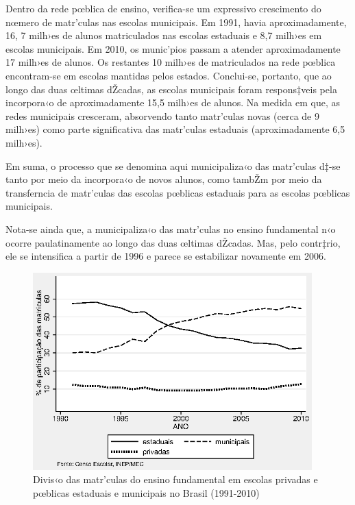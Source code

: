 \documentclass[a4paper, 12pt]{article}
\begin{document}
Dentro da rede pœblica de ensino, verifica-se um expressivo crescimento do nœmero de matr’culas nas escolas municipais. Em 1991, havia aproximadamente, 16, 7 milh›es de alunos matriculados nas escolas estaduais e 8,7 milh›es em escolas municipais. Em 2010, os munic’pios passam a atender aproximadamente 17 milh›es de alunos. Os restantes 10 milh›es de matriculados na rede pœblica encontram-se em escolas mantidas pelos estados. Conclui-se, portanto, que ao longo das duas œltimas dŽcadas, as escolas municipais foram respons‡veis pela incorpora‹o de aproximadamente 15,5  milh›es de alunos. Na medida em que, as redes municipais cresceram, absorvendo tanto matr’culas novas (cerca de 9 milh›es) como parte significativa das matr’culas estaduais (aproximadamente 6,5 milh›es). 

Em suma, o processo que se denomina aqui municipaliza‹o das matr’culas d‡-se tanto por meio da incorpora‹o de novos alunos, como tambŽm por meio da transferncia de matr’culas das escolas pœblicas estaduais para as escolas pœblicas municipais. 

Nota-se ainda que, a municipaliza‹o das matr’culas no ensino fundamental n‹o ocorre paulatinamente ao longo das duas œltimas dŽcadas. Mas, pelo contr‡rio, ele se intensifica a partir de 1996 e parece se estabilizar novamente em 2006. 



\vspace*{1cm} 

\begin{figure}[h]
\centering
\begin{footnotesize}
\caption{Divis‹o das matr’culas do ensino fundamental em escolas privadas e pœblicas estaduais e municipais no Brasil (1991-2010)} 
\label{fig:share_matriculas2}                             
 \includegraphics[height=3in]{share_matriculas2}
\end{footnotesize}
\end{figure}
 
\end{document}
